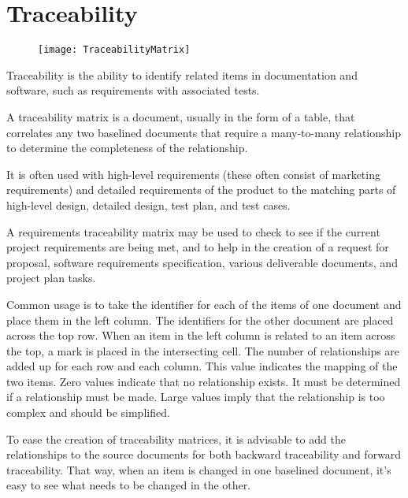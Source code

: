 \section{Traceability}
\label{sec:Traceability}

\begin{figure}[!h]
\centering
\texttt{[image: TraceabilityMatrix]}
\caption{}
\label{fig:TraceabilityMatrix}
\end{figure}

Traceability is the ability to identify related items in documentation and software, such as requirements with associated tests.

A traceability matrix is a document, usually in the form of a table, that correlates any two baselined documents that require a many-to-many relationship to determine the completeness of the relationship.

It is often used with high-level requirements (these often consist of marketing requirements) and detailed requirements of the product to the matching parts of high-level design, detailed design, test plan, and test cases.

A requirements traceability matrix may be used to check to see if the current project requirements are being met, and to help in the creation of a request for proposal, software requirements specification, various deliverable documents, and project plan tasks.

Common usage is to take the identifier for each of the items of one document and place them in the left column. The identifiers for the other document are placed across the top row. When an item in the left column is related to an item across the top, a mark is placed in the intersecting cell. The number of relationships are added up for each row and each column. This value indicates the mapping of the two items. Zero values indicate that no relationship exists. It must be determined if a relationship must be made. Large values imply that the relationship is too complex and should be simplified.

To ease the creation of traceability matrices, it is advisable to add the relationships to the source documents for both backward traceability and forward traceability. That way, when an item is changed in one baselined document, it's easy to see what needs to be changed in the other.